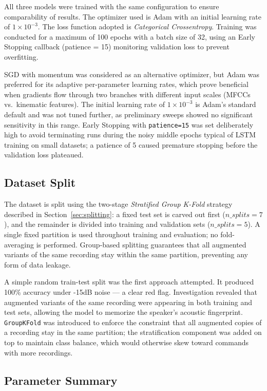 \documentclass[sigconf,screen,nonacm]{acmart}
\begin{document}
All three models were trained with the same configuration to ensure comparability of results. The optimizer used is Adam with an initial learning rate of $1 \times 10^{-3}$. The loss function adopted is \textit{Categorical Crossentropy}. Training was conducted for a maximum of 100 epochs with a batch size of 32, using an Early Stopping callback (patience = 15) monitoring validation loss to prevent overfitting.

SGD with momentum was considered as an alternative optimizer, but Adam was preferred for its adaptive per-parameter learning rates, which prove beneficial when gradients flow through two branches with different input scales (MFCCs vs.\ kinematic features). The initial learning rate of $1 \times 10^{-3}$ is Adam's standard default and was not tuned further, as preliminary sweeps showed no significant sensitivity in this range. Early Stopping with \texttt{patience=15} was set deliberately high to avoid terminating runs during the noisy middle epochs typical of LSTM training on small datasets; a patience of 5 caused premature stopping before the validation loss plateaued.

\subsection{Dataset Split}

The dataset is split using the two-stage \textit{Stratified Group K-Fold} strategy
described in Section~\ref{sec:splitting}: a fixed test set is carved out first
($n\_splits=7$), and the remainder is divided into training and validation sets
($n\_splits=5$). A single fixed partition is used throughout training and
evaluation; no fold-averaging is performed. Group-based splitting guarantees that
all augmented variants of the same recording stay within the same partition,
preventing any form of data leakage.

A simple random train-test split was the first approach attempted. It produced 100\% accuracy under -15dB noise --- a clear red flag. Investigation revealed that augmented variants of the same recording were appearing in both training and test sets, allowing the model to memorize the speaker's acoustic fingerprint. \texttt{GroupKFold} was introduced to enforce the constraint that all augmented copies of a recording stay in the same partition; the stratification component was added on top to maintain class balance, which would otherwise skew toward commands with more recordings.

\subsection{Parameter Summary}
\end{document}
